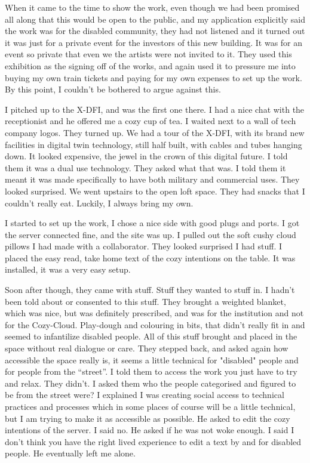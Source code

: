 When it came to the time to show the work, even though we had been
promised all along that this would be open to the public, and my
application explicitly said the work was for the disabled community,
they had not listened and it turned out it was just for a private event
for the investors of this new building. It was for an event so private
that even we the artists were not invited to it. They used this
exhibition as the signing off of the works, and again used it to
pressure me into buying my own train tickets and paying for my own
expenses to set up the work. By this point, I couldn't be bothered to
argue against this.

I pitched up to the X-DFI, and was the first one there. I had a nice
chat with the receptionist and he offered me a cozy cup of tea. I waited
next to a wall of tech company logos. They turned up. We had a tour of
the X-DFI, with its brand new facilities in digital twin technology,
still half built, with cables and tubes hanging down. It looked
expensive, the jewel in the crown of this digital future. I told them it
was a dual use technology. They asked what that was. I told them it
meant it was made specifically to have both military and commercial
uses. They looked surprised. We went upstairs to the open loft space.
They had snacks that I couldn't really eat. Luckily, I always bring my
own.

I started to set up the work, I chose a nice side with good plugs and
ports. I got the server connected fine, and the site was up. I pulled
out the soft cushy cloud pillows I had made with a collaborator. They
looked surprised I had stuff. I placed the easy read, take home text of
the cozy intentions on the table. It was installed, it was a very easy
setup.

Soon after though, they came with stuff. Stuff they wanted to stuff in.
I hadn't been told about or consented to this stuff. They brought a
weighted blanket, which was nice, but was definitely prescribed, and was
for the institution and not for the Cozy-Cloud. Play-dough and colouring
in bits, that didn't really fit in and seemed to infantilize disabled
people. All of this stuff brought and placed in the space without real
dialogue or care. They stepped back, and asked again how accessible the
space really is, it seems a little technical for "disabled" people and
for people from the ``street''. I told them to access the work you just
have to try and relax. They didn't. I asked them who the people
categorised and figured to be from the street were? I explained I was
creating social access to technical practices and processes which in
some places of course will be a little technical, but I am trying to
make it as accessible as possible. He asked to edit the cozy intentions
of the server. I said no. He asked if he was not woke enough. I said I
don't think you have the right lived experience to edit a text by and
for disabled people. He eventually left me alone.

